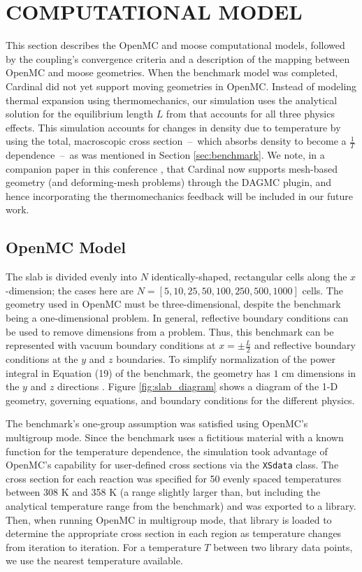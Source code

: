 \documentclass[letterpaper]{mc2023}
\begin{document}
\section{COMPUTATIONAL MODEL}\label{sec:model}
This section describes the OpenMC and \gls{moose} computational models, followed by the coupling's convergence criteria and
a description of the mapping between OpenMC and \gls{moose} geometries. When the benchmark model was completed, Cardinal did
not yet support moving geometries in OpenMC. Instead of modeling thermal expansion using thermomechanics, our simulation uses
the analytical solution for the equilibrium length $L$ from \cite{analytical-benchmark} that accounts for all three physics
effects. This simulation accounts for changes in density due to temperature by using the total, macroscopic cross section\ --\
which absorbs density to become a $\frac{1}{T}$ dependence\ --\ as was mentioned in Section \ref{sec:benchmark}. We note, in
a companion paper in this conference \cite{novak-2023}, that Cardinal now supports mesh-based geometry (and deforming-mesh
problems) through the DAGMC plugin, and hence incorporating the thermomechanics feedback will be included in our future work.

\subsection{OpenMC Model}
\label{sec:model:OpenMC}
The slab is divided evenly into $N$ identically-shaped, rectangular cells along the $x$-dimension; the cases here are $N=[5, 10,
25, 50, 100, 250, 500, 1000]$ cells.  The geometry used in OpenMC must be three-dimensional, despite the benchmark being a 
one-dimensional problem. In general, reflective boundary conditions can be used to remove dimensions from a problem. Thus, this
benchmark can be represented with vacuum boundary conditions at $x=\pm \frac{L}{2}$ and reflective boundary conditions at the $y$
and $z$ boundaries.  To simplify normalization of the power integral in Equation (19) of the benchmark, the geometry has $1$ cm
dimensions in the $y$ and $z$ directions \cite{analytical-benchmark}. Figure \ref{fig:slab_diagram} shows a diagram of the 1-D
geometry, governing equations, and boundary conditions for the different physics.

The benchmark's one-group assumption was satisfied using OpenMC's multigroup mode. Since the benchmark uses a fictitious material
with a known function for the temperature dependence, the simulation took advantage of OpenMC's capability for user-defined
cross sections via the \texttt{XSdata} class. The cross section for each reaction was specified for 50 evenly spaced temperatures
between 308 K and 358 K (a range slightly larger than, but including the  analytical temperature range from the benchmark) and was
exported to a library. Then, when running OpenMC in multigroup mode, that library is loaded to determine the appropriate cross
section in each region as temperature changes from iteration to iteration. For a temperature $T$ between two library data points,
we use the nearest temperature available.
\end{document}
